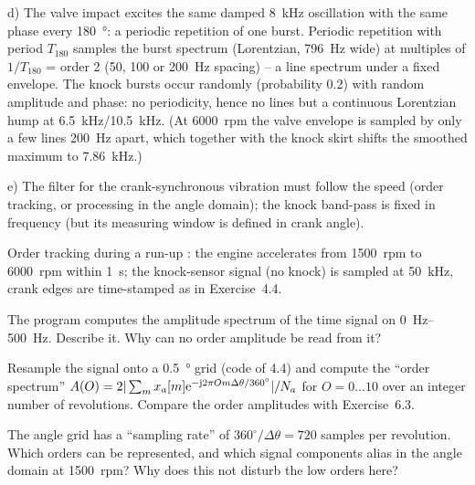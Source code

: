 \begin{solution}
d) The valve impact excites the same damped \SI{8}{kHz} oscillation with the
same phase every \SI{180}{\degree}: a periodic repetition of one burst.
Periodic repetition with period $T_{180}$ samples the burst spectrum
(Lorentzian, \SI{796}{Hz} wide) at multiples of $1/T_{180}$ = order 2 (50, 100
or \SI{200}{Hz} spacing) -- a line spectrum under a fixed envelope. The knock
bursts occur randomly (probability 0.2) with random amplitude and phase: no
periodicity, hence no lines but a continuous Lorentzian hump at
\SI{6.5}{kHz}/\SI{10.5}{kHz}. (At \SI{6000}{rpm} the valve envelope is sampled
by only a few lines \SI{200}{Hz} apart, which together with the knock skirt
shifts the smoothed maximum to \SI{7.86}{kHz}.)

e) The filter for the crank-synchronous vibration must follow the speed
(order tracking, or processing in the angle domain); the knock band-pass is
fixed in frequency (but its measuring window is defined in crank angle).
\end{solution}

\begin{exercise}{Order tracking during a run-up}{\Challenge}
: the engine accelerates from
\SI{1500}{rpm} to \SI{6000}{rpm} within \SI{1}{s}; the knock-sensor signal
(no knock) is sampled at \SI{50}{kHz}, crank edges are time-stamped as in
Exercise~4.4.
\begin{tasks}
  \item The program computes the amplitude spectrum of the time signal on
    \SIrange{0}{500}{Hz}. Describe it. Why can no order amplitude be read
    from it?
  \item Resample the signal onto a \SI{0.5}{\degree} grid (code of 4.4) and
    compute the ``order spectrum'' $A(O)=2|\sum_m x_a[m]\mathrm{e}^{-\mathrm{j}2\pi O m\Delta\theta/360^\circ}|/N_a$
    for $O=0\dots10$ over an integer number of revolutions. Compare the
    order amplitudes with Exercise~6.3.
  \item The angle grid has a ``sampling rate'' of $360^\circ/\Delta\theta=720$
    samples per revolution. Which orders can be represented, and which
    signal components alias in the angle domain at \SI{1500}{rpm}? Why does
    this not disturb the low orders here?
\end{tasks}
\end{exercise}

